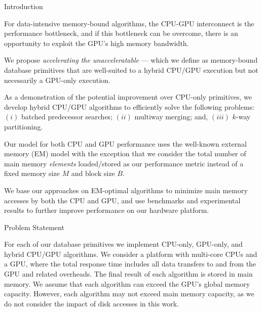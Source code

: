 \documentclass[final]{beamer}
\newlength{\colwidth}
\begin{document}
\begin{frame}[t]
\begin{columns}[t]
\begin{column}{\colwidth}
\begin{block}{Introduction}
\begin{description}[font=$\bullet$~\normalfont\scshape\color{red!50!black}]
\item For data-intensive memory-bound algorithms, the CPU-GPU interconnect is the performance bottleneck, and if this bottleneck can be overcome, there is an opportunity to exploit the GPU's high memory bandwidth.

\item We propose \emph{accelerating the unacceleratable} --- which we define as memory-bound database primitives that are well-suited to a hybrid CPU/GPU execution but not necessarily a GPU-only execution. 

\item As a demonstration of the potential improvement over CPU-only primitives, we develop hybrid CPU/GPU algorithms to efficiently solve the following problems: $(i)$ batched predecessor searches; $(ii)$ multiway merging; and, $(iii)$ $k$-way partitioning.

\item Our model for both CPU and GPU performance uses the well-known external memory (EM) model with the exception that we consider the total number of main memory \emph{elements} loaded/stored as our performance metric instead of a fixed memory size $M$ and block size $B$.

\item  We base our approaches on EM-optimal algorithms to minimize main memory accesses by both the CPU and GPU, and use benchmarks and experimental results to further improve performance on our hardware platform.

\end{description}  

  \end{block}





  \begin{alertblock}{Problem Statement}

   For each of our database primitives we implement CPU-only, GPU-only, and hybrid CPU/GPU algorithms. 
   We consider a platform with multi-core CPUs and a GPU, where the total response time includes all 
   data transfers to and from the GPU and related overheads. The final result of each algorithm is 
   stored in main memory. We assume that each algorithm can exceed the GPU's global memory capacity. 
   However, each algorithm may not exceed main memory capacity, as we do not consider the impact of disk accesses in this work.

  \end{alertblock}


\end{column}
\end{columns}
\end{frame}
\end{document}
